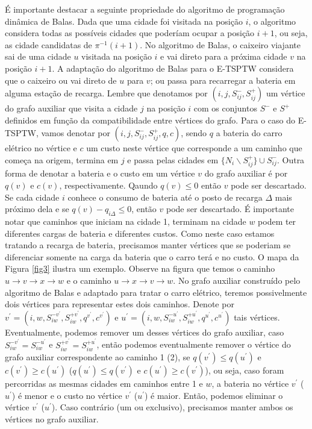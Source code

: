 \documentclass{article}
\begin{document}
É importante destacar a seguinte propriedade do algoritmo de programação dinâmica de Balas. Dada que uma cidade foi visitada na posição $i$, o algoritmo considera todas as possíveis cidades que poderíam ocupar a posição $i+1$, ou seja, as cidade candidatas de $\pi^{-1}(i+1)$. No algoritmo de Balas, o caixeiro viajante sai de uma cidade $u$ visitada na posição $i$ e vai direto para a próxima cidade $v$ na posição $i+1$. A adaptação do algoritmo de Balas para o E-TSPTW considera que o caixeiro ou vai direto de $u$ para $v$; ou passa para recarregar a bateria em alguma estação de recarga. Lembre que denotamos por $(i,j,S^-_{ij},S^+_{ij})$ um vértice do grafo auxiliar que visita a cidade $j$ na posição $i$ com os conjuntos $S^-$ e $S^+$ definidos em função da compatibilidade entre vértices do grafo. Para o caso do E-TSPTW, vamos denotar por $(i, j, S^-_{ij}, S^+_{ij}, q, c)$, sendo $q$ a bateria do carro elétrico no vértice e $c$ um custo neste vértice que corresponde a um caminho que começa na origem, termina em $j$ e passa pelas cidades em $\{N_{i} \backslash S^+_{ij}\} \cup S^-_{ij}$. Outra forma de denotar a bateria e o custo em um vértice $v$ do grafo auxiliar é por $q(v)$ e $c(v)$, respectivamente. Qaundo $q(v) \leq 0$ então $v$ pode ser descartado. Se cada cidade $i$ conhece o consumo de bateria até o posto de recarga $\Delta$ mais próximo dela e se $q(v) - q_{i\Delta} \leq 0$, então $v$ pode ser descartado. É importante notar que caminhos que iniciam na cidade 1, terminam na cidade $w$ podem ter diferentes cargas de bateria e diferentes custos. Como neste caso estamos tratando a recarga de bateria, precisamos manter vértices que se poderiam se diferenciar somente na carga da bateria que o carro terá e no custo. O mapa da Figura \ref{fig3} ilustra um exemplo. Observe na figura que temos o caminho $u \rightarrow v \rightarrow x \rightarrow w$ e o caminho $u  \rightarrow x  \rightarrow v  \rightarrow w$. No grafo auxiliar construído pelo algoritmo de Balas e adaptado para tratar o carro elétrico, teremos possivelmente dois vértices para representar estes dois caminhos. Denote por $v^\prime=(i, w, S^{-v^\prime}_{iw}, S^{+v^\prime}_{iw}, q^{v^\prime}, c^{v^\prime})$ e $u^\prime=(i, w, S^{-u^\prime}_{iw}, S^{+u^\prime}_{iw}, q^{u^\prime}, c^{u^\prime})$ tais vértices. Eventualmente, podemos remover um desses vértices do grafo auxiliar, caso $S^{-v^\prime}_{iw} = S^{-u^\prime}_{iw}$ e $S^{+v^\prime}_{iw} = S^{+u^\prime}_{iw}$, então podemos eventualmente remover o vértice do grafo auxiliar correspondente ao caminho 1 (2), se $q(v^\prime) \leq q(u^\prime)$ e $c(v^\prime) \geq c(u^\prime)$ ($q(u^\prime) \leq q(v^\prime)$ e $c(u^\prime) \geq c(v^\prime)$), ou seja, caso foram percorridas as mesmas cidades em caminhos entre 1 e $w$, a bateria no vértice $v^\prime$ ($u^\prime$) é menor e o custo no vértice $v^\prime$ ($u^\prime$) é maior. Então, podemos eliminar o vértice $v^\prime$ ($u^\prime$). Caso contrário (um ou exclusivo), precisamos manter ambos os vértices no grafo auxiliar.
\end{document}
